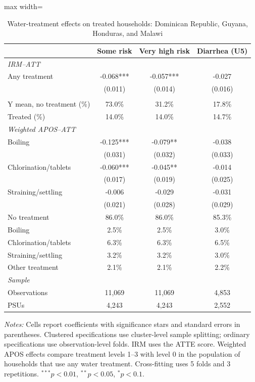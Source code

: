 \begin{table}[htbp]
\centering
\caption{Water-treatment effects on treated households: Dominican Republic, Guyana, Honduras, and Malawi}
\label{tab:water-treatment-main-selected-countries}
\scriptsize
\setlength{\tabcolsep}{4pt}
\renewcommand{\arraystretch}{0.92}
\begin{adjustbox}{max width=\linewidth}
\begin{tabular}{lccc}
\hline\hline
 & Some risk & Very high risk & Diarrhea (U5) \\
\hline
\multicolumn{4}{l}{\textit{IRM--ATT}} \\
Any treatment & -0.068*** & -0.057*** & -0.027 \\
 & (0.011) & (0.014) & (0.016) \\
\addlinespace[6pt]
\multicolumn{4}{l}{\textit{Descriptive statistics}} \\
Y mean, no treatment (\%) & 73.0\% & 31.2\% & 17.8\% \\
Treated (\%) & 14.0\% & 14.0\% & 14.7\% \\
\midrule
\multicolumn{4}{l}{\textit{Weighted APOS--ATT}} \\
Boiling & -0.125*** & -0.079** & -0.038 \\
 & (0.031) & (0.032) & (0.033) \\
Chlorination/tablets & -0.060*** & -0.045** & -0.014 \\
 & (0.017) & (0.019) & (0.025) \\
Straining/settling & -0.006 & -0.029 & -0.031 \\
 & (0.021) & (0.028) & (0.029) \\
\addlinespace[6pt]
No treatment & 86.0\% & 86.0\% & 85.3\% \\
Boiling & 2.5\% & 2.5\% & 3.0\% \\
Chlorination/tablets & 6.3\% & 6.3\% & 6.5\% \\
Straining/settling & 3.2\% & 3.2\% & 3.0\% \\
Other treatment & 2.1\% & 2.1\% & 2.2\% \\
\midrule
\multicolumn{4}{l}{\textit{Sample}} \\
Observations & 11,069 & 11,069 & 4,853 \\
PSUs & 4,243 & 4,243 & 2,552 \\
\hline\hline
\end{tabular}
\end{adjustbox}
\par\vspace{3pt}
\begin{minipage}{\linewidth}\scriptsize \textit{Notes:} Cells report coefficients with significance stars and standard errors in parentheses. Clustered specifications use cluster-level sample splitting; ordinary specifications use observation-level folds. IRM uses the ATTE score. Weighted APOS effects compare treatment levels 1--3 with level 0 in the population of households that use any water treatment. Cross-fitting uses 5 folds and 3 repetitions. $^{***}p<0.01$, $^{**}p<0.05$, $^{*}p<0.1$.\end{minipage}
\end{table}